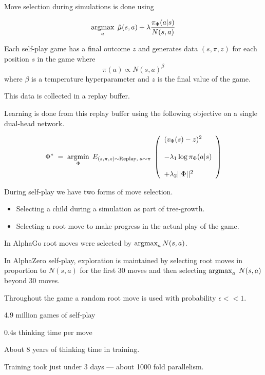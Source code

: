 {Move selection during simulations is done using

$$\operatorname*{argmax}_a \;\hat{\mu}(s,a) + \lambda \frac{\pi_\Phi(a|s)}{N(s,a)}$$

\vfill
Each self-play game has a final outcome $z$ and generates data $(s,\pi,z)$ for each position $s$ in the game where
$$\pi(a) \propto N(s,a)^\beta$$
where $\beta$ is a temperature hyperparameter and $z$ is the final value of the game.

\vfill
This data is collected in a replay buffer.


\vfill
Learning is done from this replay buffer using the following objective on a single dual-head network.

\vfill
$$\Phi^*\; = \;\operatorname*{argmin}_\Phi \;E_{(s,\pi,z) \sim \mathrm{Replay},\;a \sim \pi}\;\left(\begin{array}{l} (v_\Phi(s) - z)^2 \\ \\ - \lambda_1\log \pi_\Phi(a|s) \\ \\ + \lambda_2||\Phi||^2\end{array}\right)$$


During self-play we have two forms of move selection.

\begin{itemize}
\item Selecting a child during a simulation as part of tree-growth.
\item Selecting a root move to make progress in the actual play of the game.
\end{itemize}

\vfill
In AlphaGo root moves were selected by $\operatorname*{argmax}_a N(s,a)$.

\vfill
In AlphaZero self-play, exploration is maintained by selecting root moves in proportion to $N(s,a)$ for the first 30 moves and then
selecting $\operatorname*{argmax}_a\;N(s,a)$ beyond 30 moves.

\vfill
Throughout the game a random root move is used with probability $\epsilon << 1$.


4.9 million games of self-play

\vfill
0.4s thinking time per move

\vfill
About 8 years of thinking time in training.

\vfill
Training took just under 3 days --- about 1000 fold parallelism.

}
